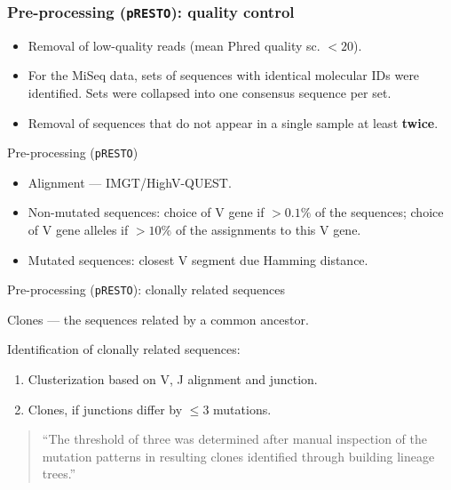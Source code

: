 \documentclass{beamer}\usepackage[]{graphicx}\usepackage[]{color}
\begin{document}
\begin{frame}
    \frametitle{Pre-processing (\texttt{pRESTO}): quality control}
    \begin{itemize}
        \item Removal of low-quality reads (mean Phred quality sc. $<20$).
        \item For the MiSeq data, sets of sequences with identical molecular
IDs were
identified. Sets were collapsed into one consensus sequence
per set.
        \pause
        \item Removal of sequences that do not appear in a single sample
            at least \textbf{twice}.
    \end{itemize}
\end{frame}

\begin{frame}{Pre-processing (\texttt{pRESTO})}
    \begin{itemize}
        \item Alignment --- IMGT/HighV-QUEST.
        \item
            Non-mutated sequences: choice of V gene if $> 0.1\%$ of the
            sequences; choice of V gene alleles if $ > 10\%$ of
            the assignments to this V gene.
        \item Mutated sequences: closest V segment due Hamming distance.
    \end{itemize}
\end{frame}

\begin{frame}{Pre-processing (\texttt{pRESTO}): clonally related sequences}

    {\color{blue} Clones --- the sequences related by a common ancestor.} 

    Identification of clonally related sequences:
    \begin{enumerate}
        \item Clusterization based on V, J alignment and junction.
        \item Clones, if junctions differ by $\le 3$ mutations.
    \end{enumerate}

    \bigskip
    \begin{quote}
        ``The threshold of three was determined after manual inspection
        of the mutation patterns in resulting clones identified through
        building lineage trees.''
    \end{quote}
\end{frame}
\end{document}
